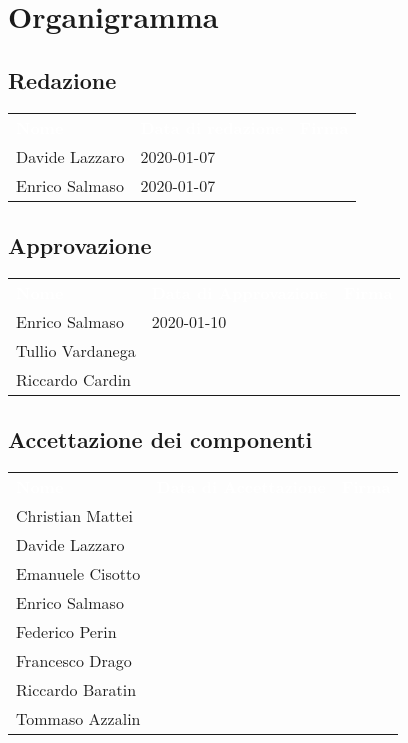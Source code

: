 \section{Organigramma}
\subsection{Redazione}
{
	\renewcommand{\arraystretch}{2}
	\centering
	\begin{longtable}{ C{5cm} C{4cm} C{5cm} }
		\textcolor{white}{\textbf{Nome}} & \textcolor{white}{\textbf{Data di redazione}} & \textcolor{white}{\textbf{Firma}}\\	
        
        Davide Lazzaro & 2020-01-07 &   \\
        Enrico Salmaso & 2020-01-07 &   \\
        		
	\end{longtable}
}

\subsection{Approvazione}
{
	\renewcommand{\arraystretch}{2}
	\centering
	\begin{longtable}{ C{5cm} C{4cm} C{5cm} }
		\textcolor{white}{\textbf{Nome}} & \textcolor{white}{\textbf{Data di Approvazione}} & \textcolor{white}{\textbf{Firma}}\\	
		
		
		Enrico Salmaso & 2020-01-10 &  \\
		Tullio Vardanega &  & \\
		Riccardo Cardin & &  \\
		
	\end{longtable}
}

\subsection{Accettazione dei componenti}
{
	\renewcommand{\arraystretch}{2}
	\centering
	\begin{longtable}{ C{5cm} C{4cm} C{5cm} }
		\textcolor{white}{\textbf{Nome}} & \textcolor{white}{\textbf{Data di Accettazione}} & \textcolor{white}{\textbf{Firma}}\\	
		
		
		Christian Mattei & & \\
		Davide Lazzaro & & \\
		Emanuele Cisotto & & \\
		Enrico Salmaso & &  \\
		Federico Perin & & \\
		Francesco Drago & &  \\
		Riccardo Baratin & &  \\
		Tommaso Azzalin & &  \\
		
		
	\end{longtable}
}


